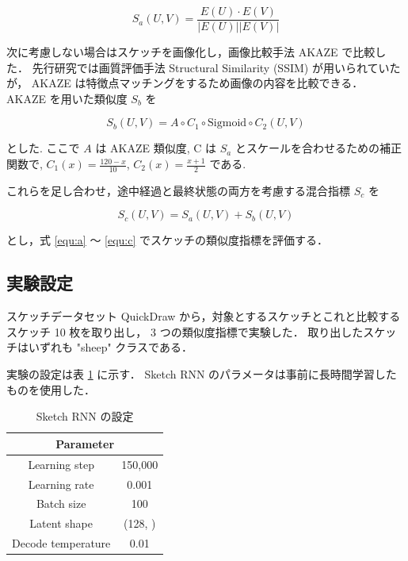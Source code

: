 \documentclass[twocolumn]{jarticle}     %
\begin{document}
\begin{equation}
  \label{equ:a}
  S_a(U, V) = \frac{E(U) \cdot E(V)}{|E(U)| |E(V)|}
\end{equation}


次に考慮しない場合はスケッチを画像化し，画像比較手法 AKAZE で比較した．
先行研究では画質評価手法 Structural Similarity (SSIM) が用いられていたが，
AKAZE は特徴点マッチングをするため画像の内容を比較できる．
AKAZE を用いた類似度 $S_b$ を

\begin{equation}
  \label{equ:b}
  S_b(U, V) = A \circ C_1 \circ \mathrm{Sigmoid} \circ C_2 (U, V)
\end{equation}

とした.
ここで $A$ は AKAZE 類似度, C は $S_a$ とスケールを合わせるための補正関数で, $C_1(x) = \frac{120 - x}{10}$, $C_2(x) = \frac{x + 1}{2}$ である.


これらを足し合わせ，途中経過と最終状態の両方を考慮する混合指標 $S_c$ を

\begin{equation}
  \label{equ:c}
  S_c(U, V) = S_a(U, V) + S_b(U, V)
\end{equation}

とし，式 \ref{equ:a} ～ \ref{equ:c} でスケッチの類似度指標を評価する．

\subsection{実験設定}
スケッチデータセット QuickDraw から，対象とするスケッチとこれと比較するスケッチ 10 枚を取り出し，
3 つの類似度指標で実験した．
取り出したスケッチはいずれも "sheep" クラスである．

実験の設定は表 \ref{tab:setting1} に示す．
Sketch RNN のパラメータは事前に長時間学習したものを使用した．

\begin{table}[tb]
  \begin{center}
    \caption{Sketch RNN の設定}
    \begin{tabular}{cc} \hline
      \multicolumn{2}{c}{Parameter}  \\ \hline
      Learning step & 150,000 \\
      Learning rate & 0.001 \\
      Batch size & 100 \\
      Latent shape & (128, ) \\
      Decode temperature & 0.01 \\ \hline
    \end{tabular}
    \label{tab:setting1}
  \end{center}
\end{table}
\end{document}
